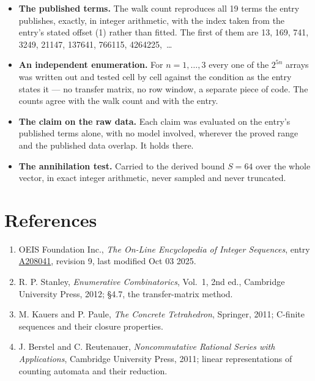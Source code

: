 \documentclass[11pt]{article}
\theoremstyle{definition}
\begin{document}
\begin{itemize}

\item {\bfseries The published terms.} The walk count reproduces all 19 terms the entry publishes, exactly, in integer arithmetic, with the index taken from the entry's stated offset (1) rather than fitted. The first of them are 13, 169, 741, 3249, 21147, 137641, 766115, 4264225,~\dots

\item {\bfseries An independent enumeration.} For $n = 1,\dots,3$ every one of the $2^{5n}$ arrays was written out and tested cell by cell against the condition as the entry states it --- no transfer matrix, no row window, a separate piece of code. The counts agree with the walk count and with the entry.

\item {\bfseries The claim on the raw data.} Each claim was evaluated on the entry's published terms alone, with no model involved, wherever the proved range and the published data overlap. It holds there.

\item {\bfseries The annihilation test.} Carried to the derived bound $S = 64$ over the whole vector, in exact integer arithmetic, never sampled and never truncated.

\end{itemize}

\section{References}

\begin{enumerate}

\item OEIS Foundation Inc., \emph{The On-Line Encyclopedia of Integer Sequences}, entry \href{https://oeis.org/A208041}{A208041}, revision 9, last modified Oct 03 2025.

\item R. P. Stanley, \emph{Enumerative Combinatorics}, Vol.~1, 2nd ed., Cambridge University Press, 2012; \S4.7, the transfer-matrix method.

\item M. Kauers and P. Paule, \emph{The Concrete Tetrahedron}, Springer, 2011; C-finite sequences and their closure properties.

\item J. Berstel and C. Reutenauer, \emph{Noncommutative Rational Series with Applications}, Cambridge University Press, 2011; linear representations of counting automata and their reduction.

\end{enumerate}
\end{document}
